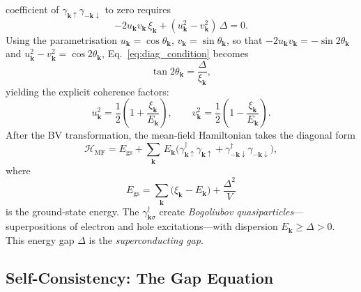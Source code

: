coefficient of $\gamma_{\mathbf{k}\uparrow}\gamma_{-\mathbf{k}\downarrow}$ to zero
requires
\begin{equation}
	-2u_{\mathbf{k}} v_{\mathbf{k}}\, \xi_{\mathbf{k}}
	+ (u_{\mathbf{k}}^2 - v_{\mathbf{k}}^2)\,\Delta = 0.
	\label{eq:diag_condition}
\end{equation}
Using the parametrisation $u_{\mathbf{k}} = \cos\theta_{\mathbf{k}}$,
$v_{\mathbf{k}} = \sin\theta_{\mathbf{k}}$, so that
$-2u_{\mathbf{k}} v_{\mathbf{k}} = -\sin 2\theta_{\mathbf{k}}$ and
$u_{\mathbf{k}}^2 - v_{\mathbf{k}}^2 = \cos 2\theta_{\mathbf{k}}$,
Eq.~\eqref{eq:diag_condition} becomes
\begin{equation}
	\tan 2\theta_{\mathbf{k}} = \frac{\Delta}{\xi_{\mathbf{k}}},
\end{equation}
yielding the explicit coherence factors:
\begin{equation}
	\boxed{
		u_{\mathbf{k}}^2 = \frac{1}{2}\!\left(1 + \frac{\xi_{\mathbf{k}}}{E_{\mathbf{k}}}\right),
		\qquad
		v_{\mathbf{k}}^2 = \frac{1}{2}\!\left(1 - \frac{\xi_{\mathbf{k}}}{E_{\mathbf{k}}}\right).}
	\label{eq:coherence_factors}
\end{equation}
After the BV transformation, the mean-field Hamiltonian takes the diagonal form
\begin{equation}
	\mathcal{H}_{\mathrm{MF}} = E_{\mathrm{gs}}
	+ \sum_{\mathbf{k}}\, E_{\mathbf{k}}
	\bigl(\gamma^\dagger_{\mathbf{k}\uparrow}\gamma_{\mathbf{k}\uparrow}
	+ \gamma^\dagger_{-\mathbf{k}\downarrow}\gamma_{-\mathbf{k}\downarrow}\bigr),
	\label{eq:H_diagonal}
\end{equation}
where
\begin{equation}
	E_{\mathrm{gs}} = \sum_{\mathbf{k}}
	\bigl(\xi_{\mathbf{k}} - E_{\mathbf{k}}\bigr)
	+ \frac{\Delta^2}{V}
	\label{eq:E_gs}
\end{equation}
is the ground-state energy. The $\gamma^\dagger_{\mathbf{k}\sigma}$ create
\emph{Bogoliubov quasiparticles}---superpositions of electron and hole
excitations---with dispersion $E_{\mathbf{k}} \geq \Delta > 0$. This energy gap
$\Delta$ is the \emph{superconducting gap}.

\subsection{Self-Consistency: The Gap Equation}

